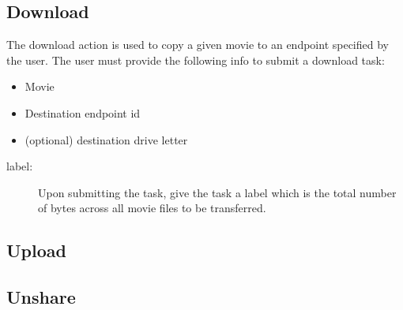 \subsection{Download}

The download action is used to copy a given movie to an endpoint specified by the user. The 
user must provide the following info to submit a download task:

\begin{itemize}
    \item Movie
    \item Destination endpoint id
    \item (optional) destination drive letter
\end{itemize}

\begin{description}
    \item[label:] Upon submitting the task, give the task a label which is the total number 
                  of bytes across all movie files to be transferred.
\end{description}

\subsection{Upload}

\subsection{Unshare}
